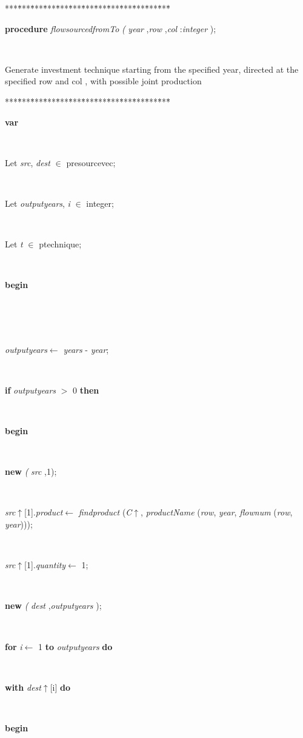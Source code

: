 \documentclass[10pt, a4paper]{article}
\begin{document}
\begin{tabbing}
***\=***\=***\=***\=***\=***\=***\=***\=***\=***\=***\=***\=***\=\kill
\parbox{14cm}{\textsf{\textbf{procedure}  \textit{flowsourcedfromTo} \textit{(} \textit{year} ,\textit{row} ,\textit{col} :\textit{integer} );}}\\
\end{tabbing}
Generate investment technique starting from the specified year,
directed at the specified row and col , with possible joint production
\begin{tabbing}
***\=***\=***\=***\=***\=***\=***\=***\=***\=***\=***\=***\=***\=\kill
\\
\+\parbox{14cm}{\textsf{\textbf{var} }}\\
\parbox{14cm}{\textsf{Let \textit{src}, \textit{dest} $\in$ presourcevec;}}\\
\parbox{14cm}{\textsf{Let \textit{outputyears}, \textit{i} $\in$ integer;}}\\
\parbox{14cm}{\textsf{Let \textit{t} $\in$ ptechnique;}}\\
\-\<\+\parbox{14cm}{\textsf{\textbf{begin} }}\\
\\
\\
\parbox{14cm}{\textsf{\textit{outputyears}$\leftarrow$ \textit{years} - \textit{year}}; }\\
\+\parbox{14cm}{\textsf {\textbf {if } \textsf{\textit{outputyears} $>$ 0} \textbf{ then } }}\\
\<\parbox{14cm}{\textsf{\textbf{begin} }}\\
\parbox{14cm}{\textsf{\textbf{new}  \textit{(} \textit{src} ,1);}}\\
\parbox{14cm}{\textsf{\textit{src}$\uparrow$\textit{}[1].\textit{product}$\leftarrow$ \textit{findproduct} (\textit{C}$\uparrow$\textit{}, \textit{productName} (\textit{row}, \textit{year}, \textit{flownum} (\textit{row}, \textit{year})))}; }\\
\parbox{14cm}{\textsf{\textit{src}$\uparrow$\textit{}[1].\textit{quantity}$\leftarrow$ 1}; }\\
\parbox{14cm}{\textsf{\textbf{new} \textit{(} \textit{dest} ,\textit{outputyears} );}}\\
\+\parbox{14cm}{\textsf {\textbf {for } \textsf{\textit{i}$\leftarrow$ 1} \textbf{ to } \textsf{\textit{outputyears}} \textbf{ do } }}\\
\+\parbox{14cm}{\textsf {\textbf {with } \textsf{\textit{dest}$\uparrow$\textit{}[i]} \textbf{ do } }}\\
\<\parbox{14cm}{\textsf{\textbf{begin} }}\\

\end{tabbing}
\end{document}
